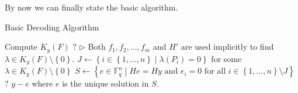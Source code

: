 By now we can finally state the basic algorithm.
\begin{algorithm}[H]
\caption{Basic Decoding Algorithm}\label{alg:basic_decoding_algorithm}
\begin{algorithmic}
  \State Compute $K_y(F)$
    \State \Return $?$
  \Else
    \State $\triangleright$ Both $f_1, f_2, \ldots, f_{m}$ and $H'$ are used implicitly to find $\lambda \in K_y(F) \setminus \left\{0\right\}$.
    \State $J \gets \left\{i \in \left\{1, \ldots, n\right\} \middle| \lambda(P_i) = 0\right\}$ for some $\lambda \in K_y(F) \setminus \left\{0\right\}$
    \State $S \gets \left\{e \in \mathbb{F}_q^n \middle| He = Hy \text{ and }  e_i = 0 \text{ for all } i \in \left\{1, \ldots, n\right\} \setminus J\right\}$
      \State \Return $?$
    \Else
      \State \Return $y - e$ where $e$ is the unique solution in $S$.
    \EndIf
  \EndIf
  \EndProcedure
\end{algorithmic}
\end{algorithm}

